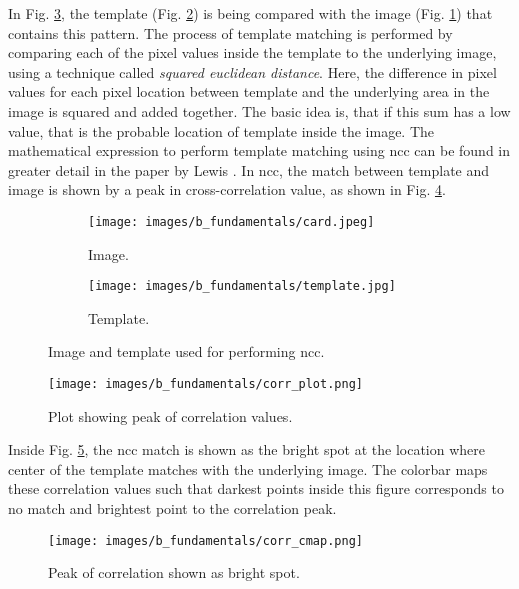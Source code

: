    \vspace{5mm}
    \noindent In Fig. \ref{fig:ncc_example}, the template (Fig. \ref{subfig:template.jpg}) is being compared with the image (Fig. \ref{subfig:card.jpg}) that contains this pattern. The process of template matching is performed by comparing each of the pixel values inside the template to the underlying image, using a technique called \emph{squared euclidean distance}. Here, the difference in pixel values for each pixel location between template and the underlying area in the image is squared and added together. The basic idea is, that if this sum has a low value, that is the probable location of template inside the image. The mathematical expression to perform template matching using \gls{ncc} can be found in greater detail in the paper by Lewis \cite{lewis}. In \gls{ncc}, the match between template and image is shown by a peak in cross-correlation value, as shown in Fig. \ref{fig:corr_plot.png}.

    \begin{figure}[h]
        \begin{subfigure}{0.5\textwidth}
            \centering
            \texttt{[image: images/b\_fundamentals/card.jpeg]}
            \caption{Image.}
            \label{subfig:card.jpg}
        \end{subfigure}
        \begin{subfigure}{0.5\textwidth}
            \centering
            \texttt{[image: images/b\_fundamentals/template.jpg]}
            \caption{Template.}
            \label{subfig:template.jpg}
        \end{subfigure}
        \caption{Image and template used for performing \gls{ncc}. \cite{img_card}}
        \label{fig:ncc_example}
    \end{figure}

    \begin{figure}[h]
        \centering
        \texttt{[image: images/b\_fundamentals/corr\_plot.png]}
        \caption{Plot showing peak of correlation values.}
        \label{fig:corr_plot.png}
    \end{figure}

    \clearpage
    
    \noindent Inside Fig. \ref{fig:corr_cmap.png}, the \gls{ncc} match is shown as the bright spot at the location where center of the template matches with the underlying image. The colorbar maps these correlation values such that darkest points inside this figure corresponds to no match and brightest point to the correlation peak.  
    
    \begin{figure}[h]
        \hspace{40pt}
        \texttt{[image: images/b\_fundamentals/corr\_cmap.png]}
        \caption{Peak of correlation shown as bright spot.}
        \label{fig:corr_cmap.png}
    \end{figure}

    \clearpage